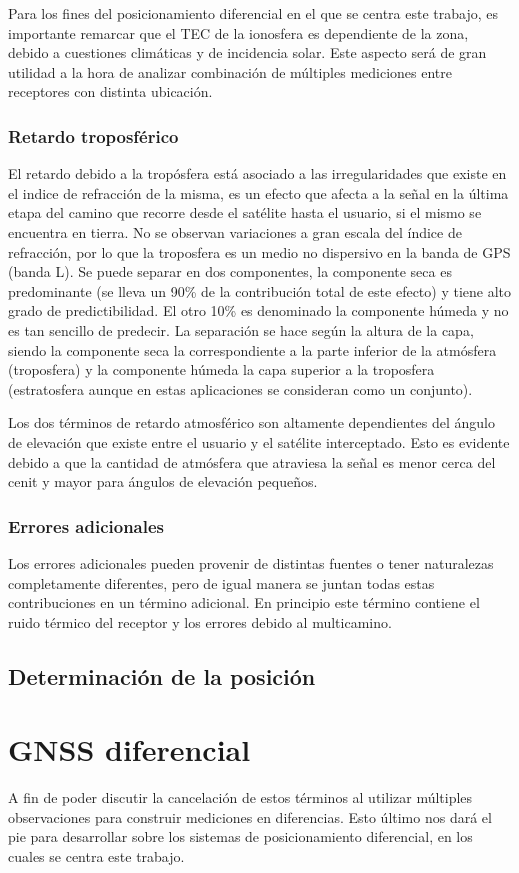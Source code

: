 \documentclass[a4paper,12pt,oneside,onecolumn,final,openright]{book}%
\begin{document}
	Para los fines del posicionamiento diferencial en el que se centra este trabajo, es importante remarcar que el TEC de la ionosfera es dependiente de la zona, debido a cuestiones climáticas y de incidencia solar. Este aspecto será de gran utilidad a la hora de analizar combinación de múltiples mediciones entre receptores con distinta ubicación.
\subsection{Retardo troposférico}
	El retardo debido a la tropósfera está asociado a las irregularidades que existe en el indice de refracción de la misma, es un efecto que afecta a la señal en la última etapa del camino que recorre desde el satélite hasta el usuario, si el mismo se encuentra en tierra. No se observan variaciones a gran escala del índice de refracción, por lo que la troposfera es un medio no dispersivo en la banda de GPS (banda L). Se puede separar en dos componentes, la componente seca es predominante (se lleva un 90\% de la contribución total de este efecto) y tiene alto grado de predictibilidad. El otro 10\% es denominado la componente húmeda y no es tan sencillo de predecir. La separación se hace según la altura de la capa, siendo la componente seca la correspondiente a la parte inferior de la atmósfera (troposfera) y la componente húmeda la capa superior a la troposfera (estratosfera aunque en estas aplicaciones se consideran como un conjunto).

	Los dos términos de retardo atmosférico son altamente dependientes del ángulo de elevación que existe entre el usuario y el satélite interceptado. Esto es evidente debido a que la cantidad de atmósfera que atraviesa la señal es menor cerca del cenit y mayor para ángulos de elevación pequeños.
\subsection{Errores adicionales}
	Los errores adicionales pueden provenir de distintas fuentes o tener naturalezas completamente diferentes, pero de igual manera se juntan todas estas contribuciones en un término adicional. En principio este término contiene el ruido térmico del receptor y los errores debido al multicamino.
\section{Determinación de la posición} 
\chapter{GNSS diferencial}
 A fin de poder discutir la cancelación de estos términos al utilizar múltiples observaciones para construir mediciones en diferencias. Esto último nos dará el pie para desarrollar sobre los sistemas de posicionamiento diferencial, en los cuales se centra este trabajo.
\end{document}
